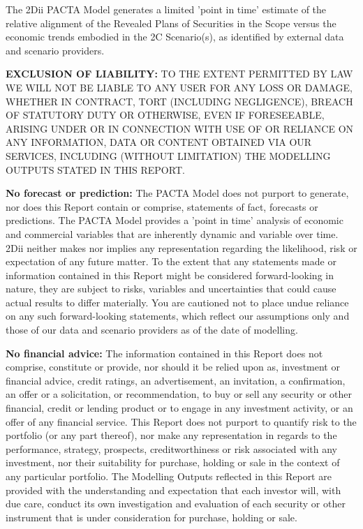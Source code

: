\documentclass[10pt,table,a4]{article}\usepackage[]{graphicx}\usepackage[]{color}
\begin{document}
	
	The 2Dii PACTA Model generates a limited 'point in time' estimate of the relative alignment of the Revealed Plans of Securities in the Scope versus the economic trends embodied in the 2C Scenario(s), as identified by external data and scenario providers. 
	
	\textbf{EXCLUSION OF LIABILITY: }TO THE EXTENT PERMITTED BY LAW WE WILL NOT BE LIABLE TO ANY USER FOR ANY LOSS OR DAMAGE, WHETHER IN CONTRACT, TORT (INCLUDING NEGLIGENCE), BREACH OF STATUTORY DUTY OR OTHERWISE, EVEN IF FORESEEABLE, ARISING UNDER OR IN CONNECTION WITH USE OF OR RELIANCE ON ANY INFORMATION, DATA OR CONTENT OBTAINED VIA OUR SERVICES, INCLUDING (WITHOUT LIMITATION) THE MODELLING OUTPUTS STATED IN THIS REPORT.
	
	\textbf{No forecast or prediction: }The PACTA Model does not purport to generate, nor does this Report contain or comprise, statements of fact, forecasts or predictions. The PACTA Model provides a 'point in time' analysis of economic and commercial variables that are inherently dynamic and variable over time. 2Dii neither makes nor implies any representation regarding the likelihood, risk or expectation of any future matter. To the extent that any statements made or information contained in this Report might be considered forward-looking in nature, they are subject to risks, variables and uncertainties that could cause actual results to differ materially. You are cautioned not to place undue reliance on any such forward-looking statements, which reflect our assumptions only and those of our data and scenario providers as of the date of modelling.
	
	\textbf{No financial advice: }The information contained in this Report does not comprise, constitute or provide, nor should it be relied upon as, investment or financial advice, credit ratings, an advertisement, an invitation, a confirmation, an offer or a solicitation, or recommendation, to buy or sell any security or other financial, credit or lending product or to engage in any investment activity, or an offer of any financial service. This Report does not purport to quantify risk to the portfolio (or any part thereof), nor make any representation in regards to the performance, strategy, prospects, creditworthiness or risk associated with any investment, nor their suitability for purchase, holding or sale in the context of any particular portfolio. The Modelling Outputs reflected in this Report are provided with the understanding and expectation that each investor will, with due care, conduct its own investigation and evaluation of each security or other instrument that is under consideration for purchase, holding or sale. 
	
\end{document}
